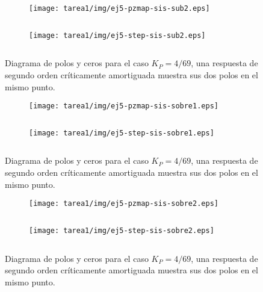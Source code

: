 \begin{ejercicio}
    \begin{figure}[H]
      \centering
      \begin{subfigure}{0.48\textwidth}
        \centering
        \texttt{[image: tarea1/img/ej5-pzmap-sis-sub2.eps]}
        \caption{$\quad$}
        \label{ej5:img3:a}
      \end{subfigure}
      \begin{subfigure}{0.48\textwidth}
        \centering
        \texttt{[image: tarea1/img/ej5-step-sis-sub2.eps]}
        \caption{$\quad$}
        \label{ej5:img3:b}
      \end{subfigure}
      \caption{Diagrama de polos y ceros para el caso $K_P = 4/69$, una respuesta de segundo orden críticamente amortiguada muestra sus dos polos en el mismo punto.}
      \label{ej5:img3}
    \end{figure}

    \begin{figure}[H]
      \centering
      \begin{subfigure}{0.48\textwidth}
        \centering
        \texttt{[image: tarea1/img/ej5-pzmap-sis-sobre1.eps]}
        \caption{$\quad$}
        \label{ej5:img4:a}
      \end{subfigure}
      \begin{subfigure}{0.48\textwidth}
        \centering
        \texttt{[image: tarea1/img/ej5-step-sis-sobre1.eps]}
        \caption{$\quad$}
        \label{ej5:img4:b}
      \end{subfigure}
      \caption{Diagrama de polos y ceros para el caso $K_P = 4/69$, una respuesta de segundo orden críticamente amortiguada muestra sus dos polos en el mismo punto.}
      \label{ej5:img4}
    \end{figure}

    \begin{figure}[H]
      \centering
      \begin{subfigure}{0.48\textwidth}
        \centering
        \texttt{[image: tarea1/img/ej5-pzmap-sis-sobre2.eps]}
        \caption{$\quad$}
        \label{ej5:img5:a}
      \end{subfigure}
      \begin{subfigure}{0.48\textwidth}
        \centering
        \texttt{[image: tarea1/img/ej5-step-sis-sobre2.eps]}
        \caption{$\quad$}
        \label{ej5:img5:b}
      \end{subfigure}
      \caption{Diagrama de polos y ceros para el caso $K_P = 4/69$, una respuesta de segundo orden críticamente amortiguada muestra sus dos polos en el mismo punto.}
      \label{ej5:img5}
    \end{figure}

\end{ejercicio}